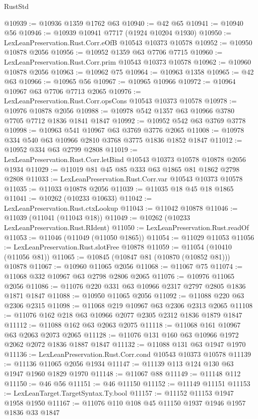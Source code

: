 \begin{lexlean}{RustStd}
\begin{coremodule}
@10939 := @10936 @1359 @1762 @63
@10940 := @42 @65
@10941 := @10940 @56
@10946 := @10939 @10941 @7717 (@1924 @10204 @1930)
@10950 := LexLeanPreservation.Rust.Corr.eOfB @10543 @10373 @10578
@10952 := @10950 @10878 @2056
@10956 := @10952 @1359 @63 @7706 @7715
@10960 := LexLeanPreservation.Rust.Corr.prim @10543 @10373 @10578
@10962 := @10960 @10878 @2056
@10963 := @10962 @75
@10964 := @10963 @1358
@10965 := @42 @63
@10966 := @10965 @56
@10967 := @10965 @10966
@10972 := @10964 @10967 @63 @7706 @7713 @2065
@10976 := LexLeanPreservation.Rust.Corr.opsCons @10543 @10373 @10578
@10978 := @10976 @10878 @2056
@10988 := @10978 @542 @1357 @63 @10966 @3780 @7705 @7712 @1836 @1841 @1847
@10992 := @10952 @542 @63 @3769 @3778
@10998 := @10963 @541 @10967 @63 @3769 @3776 @2065
@11008 := @10978 @334 @540 @63 @10966 @2810 @3768 @3775 @1836 @1852 @1847
@11012 := @10952 @334 @63 @2799 @2808
@11019 := LexLeanPreservation.Rust.Corr.letBind @10543 @10373 @10578 @10878 @2056 @1934
@11029 := @11019 @81 @45 @85 @333 @63 @1865 @81 @1862 @2798 @2808
@11033 := LexLeanPreservation.Rust.Corr.var @10543 @10373 @10578
@11035 := @11033 @10878 @2056
@11039 := @11035 @18 @45 @18 @1865
@11041 := @10262 (@10233 @10633)
@11042 := LexLeanPreservation.Rust.ctxLookup
@11043 := @11042 @10878
@11046 := @11039 (@11041 (@11043 @18))
@11049 := @10262 (@10233 LexLeanPreservation.Rust.RIdent)
@11050 := LexLeanPreservation.Rust.readOf
@11053 := @11046 (@11049 (@11050 @1865))
@11054 := @11029 @11053
@11056 := LexLeanPreservation.Rust.slotFree @10878
@11059 := @11054 (@10410 (@11056 @81))
@11065 := @10845 (@10847 @81 (@10870 (@10852 @81))) @10878
@11067 := @10960 @11065 @2056
@11068 := @11067 @75
@11074 := @11068 @332 @10967 @63 @2798 @2806 @2065
@11076 := @10976 @11065 @2056
@11086 := @11076 @220 @331 @63 @10966 @2317 @2797 @2805 @1836 @1871 @1847
@11088 := @10950 @11065 @2056
@11092 := @11088 @220 @63 @2306 @2315
@11098 := @11068 @219 @10967 @63 @2306 @2313 @2065
@11108 := @11076 @162 @218 @63 @10966 @2077 @2305 @2312 @1836 @1879 @1847
@11112 := @11088 @162 @63 @2063 @2075
@11118 := @11068 @161 @10967 @63 @2063 @2073 @2065
@11128 := @11076 @131 @160 @63 @10966 @1972 @2062 @2072 @1836 @1887 @1847
@11132 := @11088 @131 @63 @1947 @1970
@11136 := LexLeanPreservation.Rust.Corr.cond @10543 @10373 @10578
@11139 := @11136 @11065 @2056 @1934
@11147 := @11139 @113 @124 @130 @63 @1947 @1960 @1829 @1970
@11148 := @11067 @88
@11149 := @11148 @112
@11150 := @46 @56
@11151 := @46 @11150
@11152 := @11149 @11151
@11153 := LexLeanTarget.TargetSyntax.Ty.bool
@11157 := @11152 @11153 @1947 @1958 @1950
@11167 := @11076 @110 @108 @45 @11150 @1937 @1946 @1957 @1836 @33 @1847

\end{coremodule}
\end{lexlean}

